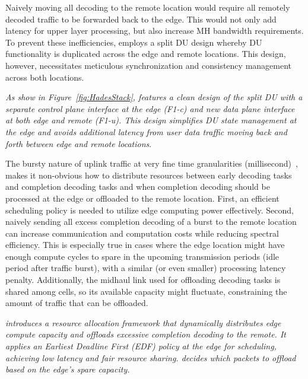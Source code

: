 \begin{description}[wide, labelindent=0pt]
    \item[Spliting DU]
    Naively moving all decoding to the remote location would require all remotely decoded traffic to be forwarded back to the edge. This would not only add latency for upper layer processing, but also increase MH bandwidth requirements. To prevent these inefficiencies, \Name{} employs a split DU design whereby DU functionality is duplicated across the edge and remote locations. 
    This design, however, necessitates meticulous synchronization and consistency management across both locations. 

    \textit{As show in Figure~\ref{fig:HadesStack}, \Name{} features a clean design of the split DU with a separate control plane interface at the edge (F1-c) and new data plane interface at both edge and remote (F1-u).
    This design simplifies DU state management at the edge and avoids additional latency from user data traffic moving back and forth between edge and remote locations}.


    \item[Adaptable utilization of edge resources] 
    The bursty nature of uplink traffic at very fine time  granularities (millisecond)~\cite{foukas2021concordia}, makes it non-obvious how to distribute resources between early decoding tasks and completion decoding tasks and when completion decoding should be processed at the edge or offloaded to the remote location. 
    First, an efficient scheduling policy is needed to utilize edge computing power effectively. Second, naively sending all excess completion decoding of a burst to the remote location can increase communication and computation costs while reducing spectral efficiency. This is especially true in cases where the edge location might have enough compute cycles to spare in the upcoming transmission periods (idle period after traffic burst), with a similar (or even smaller) processing latency penalty. 
    Additionally, the midhaul link used for offloading decoding tasks is shared among cells, so its available capacity might fluctuate, constraining the amount of traffic that can be offloaded. 
    
    \textit{\Name introduces a resource allocation framework that dynamically distributes edge compute capacity and offloads excessive completion decoding to the remote. It applies an Earliest Deadline First (EDF) policy at the edge for scheduling, achieving low latency and fair resource sharing. \Name decides which packets to offload based on the edge's spare capacity.}


\end{description}
